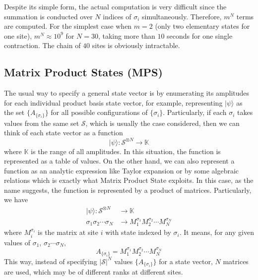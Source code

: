 \documentclass[english]{article}
\begin{document}
Despite its simple form, the actual computation is very difficult since
the summation is conducted over $N$ indices of $\sigma_{i}$
simultaneously. Therefore, $m^{N}$ terms are computed. For the simplest case when
$m=2$ (only two elementary states for one site), $m^{N}\approx10^{9}$
for $N=30$, taking more than $10$ seconds for one single contraction.
The chain of $40$ sites is obviously intractable.

\subsection{Matrix Product States (MPS)}

The usual way to specify a general state vector is by enumerating its amplitudes for each individual product basis state vector, for example, representing $|\psi\rangle$ as the set $\{A_{\{\sigma_i\}}\}$ for all possible configurations of $\{\sigma_i\}$. Particularly, if each $\sigma_i$ takes values from the same set $\mathcal{S}$, which is usually the case considered, then we can think of each state vector as a function 
\begin{displaymath}
|\psi\rangle: \mathcal{S}^{\otimes N} \rightarrow \mathbb{K}
\end{displaymath}
where $\mathbb{K}$ is the range of all amplitudes. In this situation, the function is represented as a table of values. On the other hand, we can also represent a function as an analytic expression like Taylor expansion or by some algebraic relations which is exactly what Matrix Product State exploits. In this case, as the name suggests, the function is represented by a product of matrices. Particularly, we have
\begin{displaymath}
\begin{split}
|\psi\rangle: \mathcal{S}^{\otimes N} &\rightarrow \mathbb{K} \\
\sigma_1\sigma_2\cdots\sigma_N &\rightarrow M_1^{\sigma_1}M_2^{\sigma_2}\cdots M_N^{\sigma_N}
\end{split}
\end{displaymath}
where $M_i^{\sigma_i}$ is the matrix at site $i$ with state indexed by $\sigma_i$. It means, for any given values of $\sigma_1$, $\sigma_2 \cdots \sigma_N$,
\begin{displaymath}
A_{\{\sigma_i\}} = M_1^{\sigma_1}M_2^{\sigma_2}\cdots M_N^{\sigma_N}
\end{displaymath}
This way, instead of specifying $|\mathcal{S}|^N$ values $\{A_{\{\sigma_i\}}\}$ for a state vector, $N$ matrices are used, which may be of different ranks at different sites.
\end{document}

